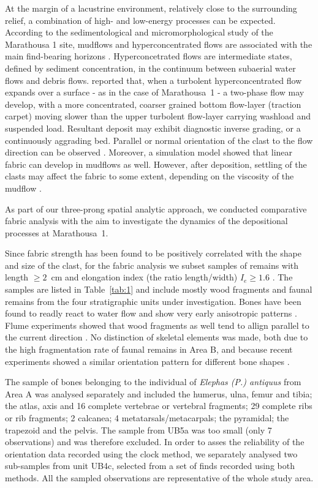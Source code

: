 \documentclass[preprint,authoryear,times]{elsarticle} %
\begin{document}
At the margin of a lacustrine environment, relatively close to the surrounding relief, a combination of high- and low-energy processes can be expected. According to the sedimentological and micromorphological study of the Marathousa 1 site, mudflows and hyperconcentrated flows are associated with the main find-bearing horizons \citep{Karkanas}. Hyperconcetrated flows are intermediate states, defined by sediment concentration, in the continuum between subaerial water flows and debris flows. \cite{Benvenuti2002} reported that, when a turbolent hyperconcentrated flow expands over a surface - as in the case of Marathousa~1 - a two-phase flow may develop, with a more concentrated, coarser grained bottom flow-layer (traction carpet) moving slower than the upper turbolent flow-layer carrying washload and suspended load. Resultant deposit may exhibit diagnostic inverse grading, or a continuously aggrading bed. Parallel or normal orientation of the clast to the flow direction can be observed \citep{Benvenuti2002}. Moreover, a simulation model showed that linear fabric can develop in mudflows as well. However, after deposition, settling of the clasts may affect the fabric to some extent, depending on the viscosity of the mudflow \citep{Lindsay1968}.
 
As part of our three-prong spatial analytic approach, we conducted comparative fabric analysis with the aim to investigate the dynamics of the depositional processes at Marathousa~1.

Since fabric strength has been found to be positively correlated with the shape and size of the clast, for the fabric analysis we subset samples of remains with length $\geq2$~cm and elongation index (the ratio length/width) $I_{e}\geq1.6$ \citep{Lenoble2004}. The samples are listed in Table~\ref{tab:1} and include mostly wood fragments and faunal remains from the four stratigraphic units under investigation. Bones have been found to readly react to water flow and show very early anisotropic patterns \citep{Dominguez-Rodrigo2014}. Flume experiments showed that wood fragments as well tend to allign parallel to the current direction \citep{Macdonald1985}. No distinction of skeletal elements was made, both due to the high fragmentation rate of faunal remains in Area B, and because recent experiments showed a similar orientation pattern for different bone shapes \citep{Dominguez-Rodrigo2012,Dominguez-Rodrigo2013}. %

The sample of bones belonging to the individual of \emph{Elephas (P.) antiquus} from Area A was analysed separately and included the humerus, ulna, femur and tibia; the atlas, axis and 16 complete vertebrae or vertebral fragments; 29 complete ribs or rib fragments; 2 calcanea; 4 metatarsals/metacarpals; the pyramidal; the trapezoid and the pelvis. The sample from UB5a was too small (only 7 observations) and was therefore excluded. In order to asses the reliability of the orientation data recorded using the clock method, we separately analysed two sub-samples from unit UB4c, selected from a set of finds recorded using both methods. All the sampled observations are representative of the whole study area.
\end{document}
